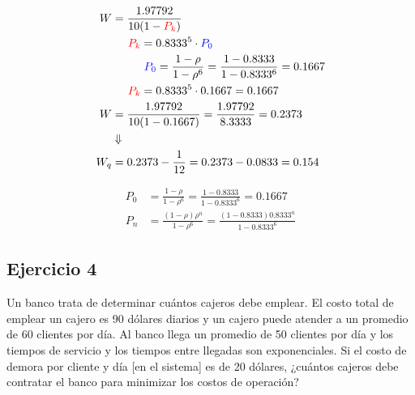 \documentclass{templateNote}
\begin{document}
\begin{mdframed}
\begin{align*}
    W &= \frac{1.97792}{10(1-\textcolor{red}{P_k})}\\
        &\hspace{5mm} \textcolor{red}{P_k} = 0.8333^5 \cdot \textcolor{blue}{P_0}\\
        &\hspace{10mm} \textcolor{blue}{P_0} = \frac{1-\rho}{1-\rho^6} = \frac{1-0.8333}{1-0.8333^6} = 0.1667\\
        &\hspace{5mm} \textcolor{red}{P_k} = 0.8333^5 \cdot 0.1667 = 0.1667\\
    W &= \frac{1.97792}{10(1-0.1667)} = \frac{1.97792}{8.3333} = 0.2373 \\
    &\Downarrow \\
    W_q &= 0.2373 - \frac{1}{12} = 0.2373 - 0.0833 = 0.154
\end{align*}
\end{mdframed}

\newpage
\begin{mdframed}
\begin{align*}
    P_0 &= \frac{1-\rho}{1-\rho^6} = \frac{1-0.8333}{1-0.8333^6} = 0.1667 \\
    P_n &= \frac{(1-\rho)\rho^n}{1-\rho^6} = \frac{(1-0.8333)0.8333^n}{1-0.8333^6}
\end{align*}
\end{mdframed}


\newpage
\subsection{Ejercicio 4}
\noindent Un banco trata de determinar cuántos cajeros debe emplear. El costo total de emplear un cajero es 90 dólares diarios y un cajero puede atender a un promedio de 60 clientes por día. Al banco llega un promedio de 50 clientes por día y los tiempos de servicio y los tiempos entre llegadas son exponenciales. Si el costo de demora por cliente y día [en el sistema] es de 20 dólares, ¿cuántos cajeros debe contratar el banco para minimizar los costos de operación?
\end{document}
